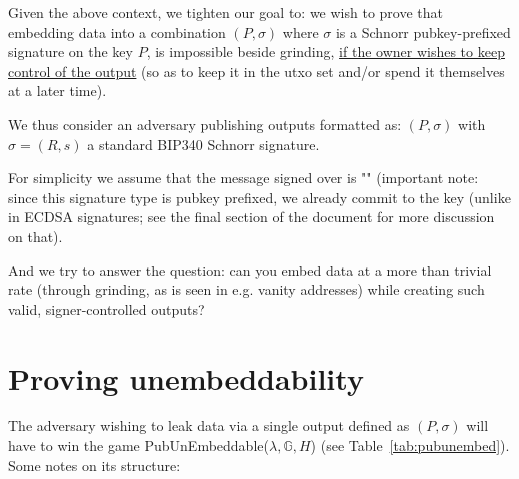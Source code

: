 \documentclass[10pt,a4paper]{article}
\theoremstyle{definition}   %
\theoremstyle{remark}       %
\newcommand{\G}{\mathbb{G}}
\begin{document}
Given the above context, we tighten our goal to: we wish to prove that embedding data into a combination $(P, \sigma)$ where $\sigma$ is a Schnorr pubkey-prefixed signature on the key $P$, is impossible beside grinding, \uline{if the owner wishes to keep control of the output} (so as to keep it in the utxo set and/or spend it themselves at a later time).

\vskip 0.2in

We thus consider an adversary publishing outputs formatted as: $(P, \sigma)$ with $\sigma = (R, s)$ a standard BIP340 Schnorr signature.

\vskip 0.2in

For simplicity we assume that the message signed over is "" (important note: since this signature type is pubkey prefixed, we already commit to the key (unlike in ECDSA signatures; see the final section of the document for more discussion on that).

\vskip 0.2in

And we try to answer the question: can you embed data at a more than trivial rate (through grinding, as is seen in e.g. vanity addresses) while creating such valid, signer-controlled outputs?

\section{Proving unembeddability}

The adversary wishing to leak data via a single output defined as $(P, \sigma)$ will have to win the game PubUnEmbeddable($\lambda, \G, H$) (see Table~\ref{tab:pubunembed}). Some notes on its structure:
\end{document}
